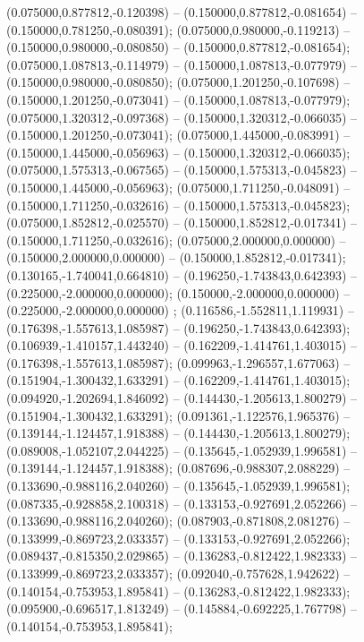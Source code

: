  (0.075000,0.877812,-0.120398) -- (0.150000,0.877812,-0.081654) -- (0.150000,0.781250,-0.080391);
 (0.075000,0.980000,-0.119213) -- (0.150000,0.980000,-0.080850) -- (0.150000,0.877812,-0.081654);
 (0.075000,1.087813,-0.114979) -- (0.150000,1.087813,-0.077979) -- (0.150000,0.980000,-0.080850);
 (0.075000,1.201250,-0.107698) -- (0.150000,1.201250,-0.073041) -- (0.150000,1.087813,-0.077979);
 (0.075000,1.320312,-0.097368) -- (0.150000,1.320312,-0.066035) -- (0.150000,1.201250,-0.073041);
 (0.075000,1.445000,-0.083991) -- (0.150000,1.445000,-0.056963) -- (0.150000,1.320312,-0.066035);
 (0.075000,1.575313,-0.067565) -- (0.150000,1.575313,-0.045823) -- (0.150000,1.445000,-0.056963);
 (0.075000,1.711250,-0.048091) -- (0.150000,1.711250,-0.032616) -- (0.150000,1.575313,-0.045823);
 (0.075000,1.852812,-0.025570) -- (0.150000,1.852812,-0.017341) -- (0.150000,1.711250,-0.032616);
 (0.075000,2.000000,0.000000) -- (0.150000,2.000000,0.000000) -- (0.150000,1.852812,-0.017341);
 (0.130165,-1.740041,0.664810) -- (0.196250,-1.743843,0.642393) -- (0.225000,-2.000000,0.000000);
 (0.150000,-2.000000,0.000000) -- (0.225000,-2.000000,0.000000) ;
 (0.116586,-1.552811,1.119931) -- (0.176398,-1.557613,1.085987) -- (0.196250,-1.743843,0.642393);
 (0.106939,-1.410157,1.443240) -- (0.162209,-1.414761,1.403015) -- (0.176398,-1.557613,1.085987);
 (0.099963,-1.296557,1.677063) -- (0.151904,-1.300432,1.633291) -- (0.162209,-1.414761,1.403015);
 (0.094920,-1.202694,1.846092) -- (0.144430,-1.205613,1.800279) -- (0.151904,-1.300432,1.633291);
 (0.091361,-1.122576,1.965376) -- (0.139144,-1.124457,1.918388) -- (0.144430,-1.205613,1.800279);
 (0.089008,-1.052107,2.044225) -- (0.135645,-1.052939,1.996581) -- (0.139144,-1.124457,1.918388);
 (0.087696,-0.988307,2.088229) -- (0.133690,-0.988116,2.040260) -- (0.135645,-1.052939,1.996581);
 (0.087335,-0.928858,2.100318) -- (0.133153,-0.927691,2.052266) -- (0.133690,-0.988116,2.040260);
 (0.087903,-0.871808,2.081276) -- (0.133999,-0.869723,2.033357) -- (0.133153,-0.927691,2.052266);
 (0.089437,-0.815350,2.029865) -- (0.136283,-0.812422,1.982333) -- (0.133999,-0.869723,2.033357);
 (0.092040,-0.757628,1.942622) -- (0.140154,-0.753953,1.895841) -- (0.136283,-0.812422,1.982333);
 (0.095900,-0.696517,1.813249) -- (0.145884,-0.692225,1.767798) -- (0.140154,-0.753953,1.895841);
